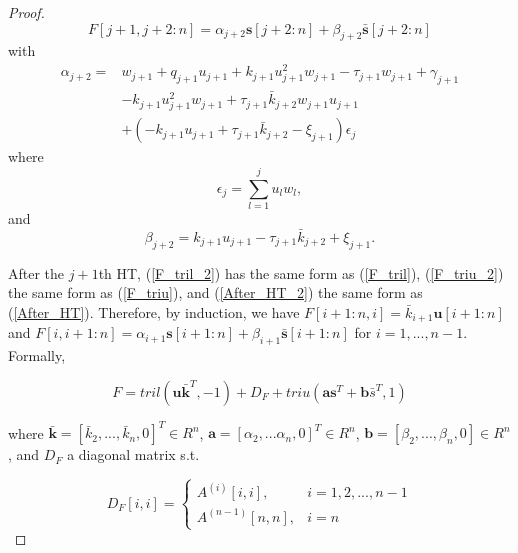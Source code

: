 \documentclass{article}
\begin{document}
\begin{proof}
\begin{equation}
    F[j+1,j+2:n]=\alpha_{j+2} \mathbf{s}[j+2:n]+\beta_{j+2}\bar{\mathbf{s}}[j+2:n] \label{F_triu_2}
\end{equation}
with
\begin{equation}
\begin{aligned}
    \alpha_{j+2}=&w_{j+1}+q_{j+1}u_{j+1}+k_{j+1}u_{j+1}^2w_{j+1}-\tau_{j+1} w_{j+1}+\gamma_{j+1}\\& - k_{j+1}u_{j+1}^2w_{j+1}+\tau_{j+1} \bar{k}_{j+2}w_{j+1}u_{j+1}\\&+(-k_{j+1}u_{j+1}+\tau_{j+1} \bar{k}_{j+2}-\xi_{j+1})\epsilon_j
\end{aligned}
\end{equation}
where
\begin{equation}
    \epsilon_j=\sum_{l=1}^ju_lw_l,
\end{equation}
and
\begin{equation}
    \beta_{j+2}=k_{j+1}u_{j+1}-\tau_{j+1} \bar{k}_{j+2}+\xi_{j+1}.
\end{equation}

After the $j+1$th HT, (\ref{F_tril_2}) has the same form as (\ref{F_tril}), (\ref{F_triu_2}) the same form as (\ref{F_triu}), and (\ref{After_HT_2}) the same form as (\ref{After_HT}). Therefore, by induction, we have $F[i+1:n, i]=\bar{k}_{i+1}\mathbf{u}[i+1:n]$ and $F[i,i+1:n]=\alpha_{i+1}\mathbf{s}[i+1:n]+\beta_{i+1}\bar{\mathbf{s}}[i+1:n]$ for $i=1,...,n-1$. Formally,

\begin{equation}
    F=tril(\mathbf{u}\bar{\mathbf{k}}^T,-1)+D_F+triu(\mathbf{a}\mathbf{s}^T+\mathbf{b}\bar{s}^T,1)
\end{equation}

where $\bar{\mathbf{k}}=[\bar{k}_2,...,\bar{k}_n,0]^T\in R^n$, $\mathbf{a}=[\alpha_2,...\alpha_n,0]^T\in R^n$, $\mathbf{b}=[\beta_2,...,\beta_n, 0]\in R^n$, and $D_F$ a diagonal matrix s.t.

\begin{equation}
D_F[i,i]=
\begin{cases}
    A^{(i)}[i,i], & i=1,2,...,n-1 \\
    A^{(n-1)}[n,n], & i=n
\end{cases}
\end{equation}

\end{proof}
\end{document}
